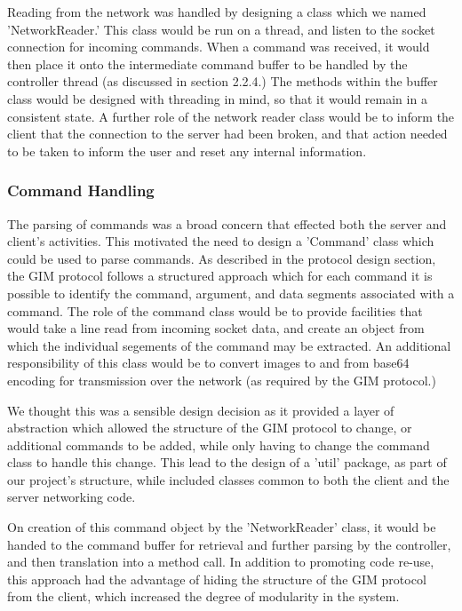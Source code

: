Reading from the network was handled by designing a class which we named 'NetworkReader.' This class would be run on a thread, and listen to the socket connection for incoming commands. When a command was received, it would then place it onto the intermediate command buffer to be handled by the controller thread (as discussed in section 2.2.4.) The methods within the buffer class would be designed with threading in mind, so that it would remain in a consistent state. A further role of the network reader class would be to inform the client that the connection to the server had been broken, and that action needed to be taken to inform the user and reset any internal information.

\subsubsection {Command Handling }

The parsing of commands was a broad concern that effected both the server and client's activities. This motivated the need to design a 'Command' class which could be used to parse commands. As described in the protocol design section, the GIM protocol follows a structured approach which for each command it is possible to identify the command, argument, and data segments associated with a command. The role of the command class would be to provide facilities that would take a line read from incoming socket data, and create an object from which the individual segements of the command may be extracted. An additional responsibility of this class would be to convert images to and from base64 encoding for transmission over the network (as required by the GIM protocol.)

We thought this was a sensible design decision as it provided a layer of abstraction which allowed the structure of the GIM protocol to change, or additional commands to be added, while only having to change the command class to handle this change. This lead to the design of a 'util' package, as part of our project's structure, while included classes common to both the client and the server networking code. 

On creation of this command object by the 'NetworkReader' class, it would be handed to the command buffer for retrieval and further parsing by the controller, and then translation into a method call. In addition to promoting code re-use, this approach had the advantage of hiding the structure of the GIM protocol from the client, which increased the degree of modularity in the system.   

















